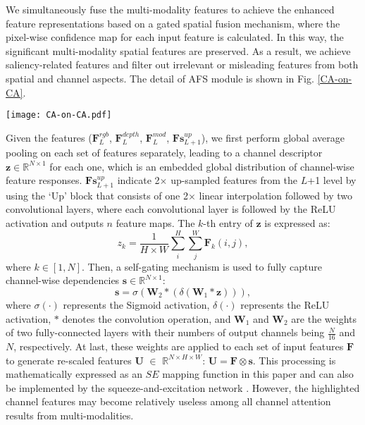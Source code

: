 \documentclass[runningheads]{llncs}
\begin{document}
We simultaneously fuse the multi-modality features to achieve the enhanced feature representations based on a gated spatial fusion mechanism, where the pixel-wise confidence map for each input feature is calculated. In this way, the significant multi-modality spatial features are preserved. As a result, we achieve saliency-related features and filter out irrelevant or misleading features from both  spatial and channel aspects. The detail of AFS module is shown in Fig. \ref{CA-on-CA}.

\begin{figure*}[!t]
	\centering
	\texttt{[image: CA-on-CA.pdf]}
	\caption{\textbf{The detail of AFS module}. `Cat' represents the concatenation operation. `SE-Net' is the squeeze-and-excitation network.}
	\label{CA-on-CA}
\end{figure*}


Given the features ($\mathbf{F}_{L}^{rgb}$, $\mathbf{F}_{L}^{depth}$, $\mathbf{F}_{L}^{mod}$, $\mathbf{Fs}_{L+1}^{up}$), we first perform global average pooling on each set of features separately, leading to a channel descriptor $\mathbf{z}\in\mathbb{R}^{N\times 1}$ for each one, which is an embedded global distribution of channel-wise feature responses. $\mathbf{Fs}_{L+1}^{up}$ indicate 2$\times$ up-sampled features from the $L$+1 level by using the `Up' block that consists of one 2$\times$ linear interpolation followed by two convolutional layers, where each convolutional layer is followed by the ReLU activation and outputs $n$ feature maps. The $k$-th entry of $\mathbf{z}$ is expressed as:
\begin{equation}
\label{equ_3}
z_{k} =\frac{1}{H\times W} \sum_{i}^{H} \sum_{j}^{W} \mathbf{F}_{k}(i,j),
\end{equation}
where $k\in[1,N]$. Then, a self-gating mechanism is used to fully capture channel-wise dependencies $\mathbf{s}\in\mathbb{R}^{N\times 1}$:
\begin{equation}
\label{equ_4}
\mathbf{s}=\mathscr{\sigma}(\mathbf{W}_{2}\ast(\mathscr{\delta}(\mathbf{W}_{1}\ast\mathbf{z}))),
\end{equation}
where $\mathscr{\sigma}(\cdot)$ represents the Sigmoid activation,  $\mathscr{\delta}(\cdot)$ represents the ReLU activation, $\ast$ denotes the convolution operation, and $\mathbf{W}_{1}$ and $\mathbf{W}_{2}$ are the weights of two fully-connected layers with their numbers of output channels being $\frac{N}{16}$ and $N$, respectively. At last, these weights are applied to each set of input features $\mathbf{F}$ to generate re-scaled features $\mathbf{U}$ $\in$ $\mathbb{R}^{N\times H\times W}$: $\mathbf{U} =\mathbf{F}\otimes \mathbf{s}$.
This processing is mathematically expressed as an $SE$ mapping function in this paper and  can also be implemented by the squeeze-and-excitation network \cite{ChannelAtt}. However, the highlighted channel features may become relatively useless among all channel attention results from multi-modalities.
\end{document}

